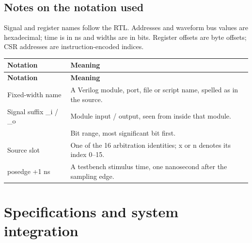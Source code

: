\documentclass[11pt]{article}
\begin{document}
\subsection{Notes on the notation used}
\noindent Signal and register names follow the RTL. Addresses and waveform bus values are hexadecimal; time is in ns and widths are in bits. Register offsets are byte offsets; CSR addresses are instruction-encoded indices.\par\medskip
{\small
\begin{longtable}{@{}L{0.2600\dimexpr\linewidth-12pt\relax}L{0.7400\dimexpr\linewidth-12pt\relax}@{}}
\toprule
\textbf{Notation} & \textbf{Meaning} \\ \midrule
\endfirsthead
\toprule
\textbf{Notation} & \textbf{Meaning} \\ \midrule
\endhead
Fixed-width name & A Verilog module, port, file or script name, spelled as in the source. \\ \addlinespace[3pt]
Signal suffix \_i / \_o & Module input / output, seen from inside that module. \\ \addlinespace[3pt]
[a:b] & Bit range, most significant bit first. \\ \addlinespace[3pt]
Source slot & One of the 16 arbitration identities; x or n denotes its index 0–15. \\ \addlinespace[3pt]
posedge +1 ns & A testbench stimulus time, one nanosecond after the sampling edge. \\*
\bottomrule\end{longtable}}

\clearpage
\section{Specifications and system integration}
\end{document}
